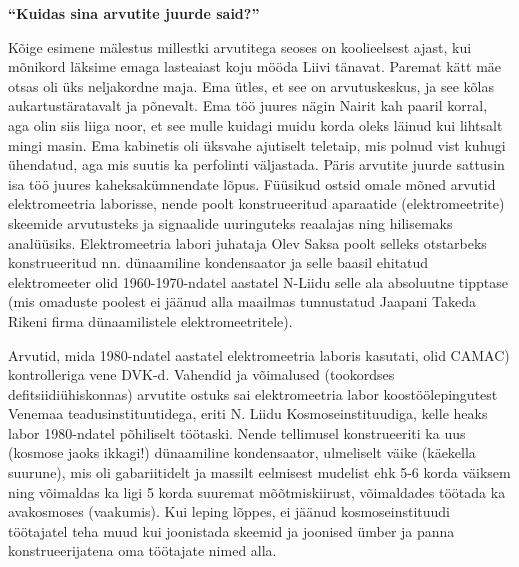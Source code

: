
\textbf{\enquote{Kuidas sina arvutite juurde said?}}

Kõige esimene mälestus millestki arvutitega seoses on koolieelsest ajast, kui
mõnikord läksime emaga lasteaiast koju mööda Liivi tänavat. Paremat kätt mäe
otsas oli üks neljakordne maja. Ema ütles, et see on arvutuskeskus, ja see
kõlas aukartustäratavalt ja põnevalt. Ema töö juures nägin Nairit kah paaril
korral, aga olin siis liiga noor, et see mulle kuidagi muidu korda oleks
läinud kui lihtsalt mingi masin. Ema kabinetis oli üksvahe ajutiselt teletaip,
mis polnud vist kuhugi ühendatud, aga mis suutis ka perfolinti väljastada.
Päris arvutite juurde sattusin isa töö juures kaheksakümnendate lõpus. Füüsikud
ostsid omale mõned arvutid elektromeetria laborisse, nende poolt konstrueeritud
aparaatide (elektromeetrite) skeemide arvutusteks ja signaalide uuringuteks reaalajas ning
hilisemaks analüüsiks. Elektromeetria labori juhataja Olev
Saksa poolt selleks otstarbeks konstrueeritud nn.
dünaamiline kondensaator ja selle baasil ehitatud elektromeeter olid
1960-1970-ndatel aastatel N-Liidu selle ala absoluutne tipptase (mis omaduste
poolest ei jäänud alla maailmas tunnustatud Jaapani Takeda Rikeni firma
dünaamilistele elektromeetritele).

Arvutid, mida 1980-ndatel aastatel elektromeetria laboris kasutati, olid
CAMAC) kontrolleriga vene
DVK-d.
Vahendid ja võimalused (tookordses defitsiidiühiskonnas) arvutite ostuks sai
elektromeetria labor koostöölepingutest Venemaa teadusinstituutidega, eriti N.
Liidu Kosmoseinstituudiga, kelle heaks labor 1980-ndatel põhiliselt töötaski.
Nende tellimusel konstrueeriti ka uus (kosmose jaoks ikkagi!) dünaamiline
kondensaator, ulmeliselt väike (käekella suurune), mis oli gabariitidelt ja
massilt eelmisest mudelist ehk 5-6 korda väiksem ning võimaldas ka ligi 5 korda
suuremat mõõtmiskiirust, võimaldades töötada ka avakosmoses (vaakumis). Kui
leping lõppes, ei jäänud kosmoseinstituudi töötajatel teha muud kui joonistada
skeemid ja joonised ümber ja panna konstrueerijatena oma töötajate nimed alla.

